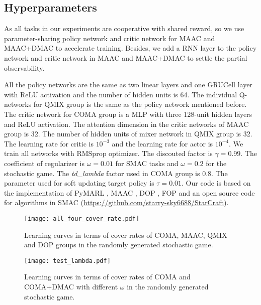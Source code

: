 \documentclass{article}
\begin{document}
\subsection{Hyperparameters}
\label{app:hyper}
	As all tasks in our experiments are cooperative with shared reward, so we use parameter-sharing policy network and critic network for MAAC and MAAC+DMAC to accelerate training. Besides, we add a RNN layer to the policy network and critic network in MAAC and MAAC+DMAC to settle the partial observability. 
	
	All the policy networks are the same as two linear layers and one GRUCell layer with ReLU activation and the number of hidden units is 64. The individual Q-networks for QMIX group is the same as the policy network mentioned before. The critic network for COMA group is a MLP with three 128-unit hidden layers and ReLU activation. The attention dimension in the critic networks of MAAC group is 32. The number of hidden units of mixer network in QMIX group is 32. The learning rate for critic is $10^{-3}$ and the learning rate for actor is $10^{-4}$.  We train all networks with RMSprop optimizer. The discouted factor is $\gamma = 0.99$. The coefficient of regularizer is $\omega = 0.01$ for SMAC tasks and $\omega = 0.2$ for the stochastic game. The \textit{td\_lambda} factor used in COMA group is $0.8$. The parameter used for soft updating target policy is $\tau = 0.01$. Our code is based on the implementation of PyMARL \citep{SMAC}, MAAC \citep{MAAC}, DOP \citep{DOP}, FOP \citep{FOP}  and an open source code for algorithms in SMAC (\url{https://github.com/starry-sky6688/StarCraft}).
	
	\begin{figure*}[t]
		\centering
		\texttt{[image: all\_four\_cover\_rate.pdf]}
		\vspace*{-0.8cm} 
		\caption{Learning curves in terms of cover rates of COMA, MAAC, QMIX and DOP groups in the randomly generated stochastic game.}
		\label{four-cover-rate} 
	\end{figure*}
	
	\begin{figure*}[!t]
		\centering
		\texttt{[image: test\_lambda.pdf]}
		\vspace*{-0.4cm}
		\caption{Learning curves in terms of cover rates of COMA and COMA+DMAC with different $\omega$ in the randomly generated stochastic game.}
		\label{learning-curve-omega}
		\vspace*{-0.2cm} 
	\end{figure*}
	
\end{document}
